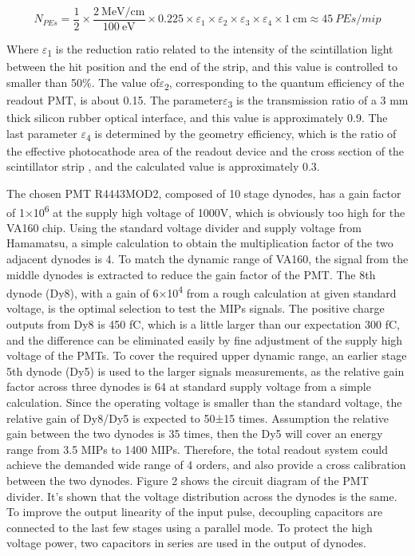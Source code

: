 \documentclass[5p, times]{elsarticle}
\begin{document}
\begin{equation}
 N_{PEs} = \frac{1}{2} \times \frac{\SI[per-mode=symbol]{2}{\mega\electronvolt\per\centi\meter}}{\SI{100}{\electronvolt}} \times 0.225
           \times \varepsilon_{1} \times \varepsilon_{2} \times \varepsilon_{3} \times \varepsilon_{4} \times \SI{1}{\centi\meter}
        \approx \SI{45}{PEs/mip}
\label{eq:pecalculation}
\end{equation} 

Where $\varepsilon $\textsubscript{1} is the reduction ratio related to the intensity of the scintillation light between
the hit position and the end of the strip, and this value is controlled to smaller than 50\%. The value of$\varepsilon
$\textsubscript{2}, corresponding to the quantum efficiency of the readout PMT, is about 0.15. The
parameter$\varepsilon $\textsubscript{3 }is the transmission ratio of a 3 mm thick silicon rubber optical interface,
and this value is approximately 0.9. The last parameter $\varepsilon $\textsubscript{4 }is determined by the geometry
efficiency, which is the ratio of the effective photocathode area of the readout device and the cross section of the
scintillator strip , and the calculated value is approximately 0.3.


The chosen PMT R4443MOD2, composed of 10 stage dynodes, has a gain factor of 1×10\textsuperscript{6} at the supply high
voltage of 1000V, which is obviously too high for the VA160 chip. Using the standard voltage divider and supply voltage
from Hamamatsu, a simple calculation to obtain the multiplication factor of the two adjacent dynodes is 4. To match the
dynamic range of VA160, the signal from the middle dynodes is extracted to reduce the gain factor of the PMT. The 8th
dynode (Dy8), with a gain of 6×10\textsuperscript{4} from a rough calculation at given standard voltage, is the optimal
selection to test the MIPs signals. The positive charge outputs from Dy8 is 450 fC, which is a little larger than our
expectation 300 fC, and the difference can be eliminated easily by fine adjustment of the supply high voltage of the
PMTs. To cover the required upper dynamic range, an earlier stage 5th dynode (Dy5) is used to the larger signals
measurements, as the relative gain factor across three dynodes is 64 at standard supply voltage from a simple
calculation. Since the operating voltage is smaller than the standard voltage, the relative gain of Dy8/Dy5 is expected
to 50±15 times. Assumption the relative gain between the two dynodes is 35 times, then the Dy5 will cover an energy
range from 3.5 MIPs to 1400 MIPs. Therefore, the total readout system could achieve the demanded wide range of 4
orders, and also provide a cross calibration between the two dynodes. Figure 2 shows the circuit diagram of the PMT
divider. It’s shown that the voltage distribution across the dynodes is the same. To improve the output linearity of
the input pulse, decoupling capacitors are connected to the last few stages using a parallel mode. To protect the high
voltage power, two capacitors in series are used in the output of dynodes.
\end{document}
